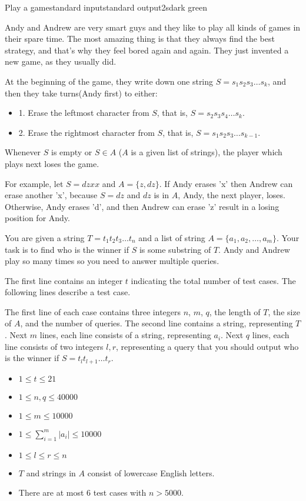\begin{problem}{Play a game}{standard input}{standard output}{2s}{dark green}

Andy and Andrew are very smart guys and they like to play all kinds of games in their spare time.
The most amazing thing is that they always find the best strategy, and that's why they feel bored again
and again. They just invented a new game, as they usually did.

At the beginning of the game, they write down one string $S=s_1s_2s_3\ldots s_k$, and then they take turns(Andy first) to either:

\begin{itemize}
\item 1. Erase the leftmost character from $S$, that is, $S=s_2s_3s_4\ldots s_k$. 
\item 2. Erase the rightmost character from $S$, that is, $S=s_1s_2s_3\ldots s_{k-1}$. 
\end{itemize}

Whenever $S$ is empty or $S\in A$ ($A$ is a given list of strings), the player which plays next loses the game.

For example, let $S=dzxx$ and $A=\{z,dz\}$. If Andy erases 'x' then Andrew can erase another 'x', 
because $S=dz$ and $dz$ is in $A$, Andy, the next player, loses. 
Otherwise, Andy erases 'd', and then Andrew can erase 'z' result in a losing position for Andy.

You are given a string $T=t_1t_2t_3\ldots t_n$ and a list of string $A=\{a_1,a_2,\ldots,a_m\}$. 
Your task is to find who is the winner if $S$ is some substring of $T$. 
Andy and Andrew play so many times so you need to answer multiple queries.

\InputFile
The first line contains an integer $t$ indicating the total number of test cases.
The following lines describe a test case.

The first line of each case contains three integers $n$, $m$, $q$, 
the length of $T$, the size of $A$, and the number of queries.
The second line contains a string, representing $T$.
Next $m$ lines, each line consists of a string, 
representing $a_i$.
Next $q$ lines, each line consists of two integers $l,r$, 
representing a query that you should output who is the winner if $S=t_lt_{l+1}\ldots t_{r}$.

\begin{itemize}
\item $1 \le t \le 21$
\item $1 \le n, q \le 40000$
\item $1 \le m \le 10000$
\item $1 \le \sum\limits_{i=1}^{m}|a_i| \le 10000$
\item $1 \le l \le r \le n$
\item $T$ and strings in $A$ consist of lowercase English letters.
\item There are at most 6 test cases with $n>5000$.
\end{itemize}


\end{problem}
